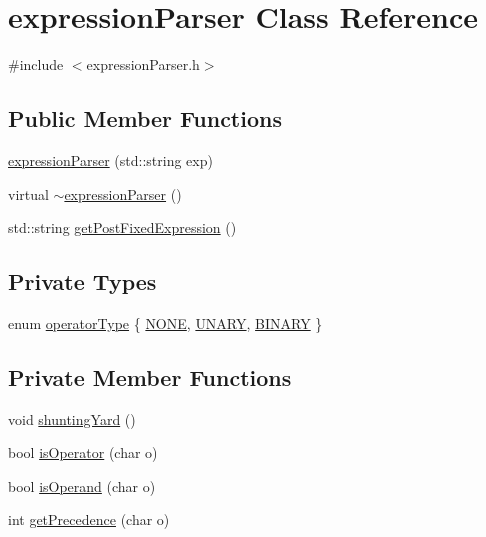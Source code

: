 \hypertarget{classexpression_parser}{\section{expression\-Parser Class Reference}
\label{classexpression_parser}
}


{\ttfamily \#include $<$expression\-Parser.\-h$>$}

\subsection*{Public Member Functions}
\begin{DoxyCompactItemize}
\item 
\hyperlink{classexpression_parser_ae675c52633c8990b0aa955fd7d9e6338}{expression\-Parser} (std\-::string exp)
\item 
virtual \hyperlink{classexpression_parser_ade3e01d93233c908ee7ae8d6bec391f7}{$\sim$expression\-Parser} ()
\item 
std\-::string \hyperlink{classexpression_parser_a718ef8608ee8b606dba30b0f249e21a9}{get\-Post\-Fixed\-Expression} ()
\end{DoxyCompactItemize}
\subsection*{Private Types}
\begin{DoxyCompactItemize}
\item 
enum \hyperlink{classexpression_parser_a32095df887afef8d80a03f4a44701b5b}{operator\-Type} \{ \hyperlink{classexpression_parser_a32095df887afef8d80a03f4a44701b5ba91e943f954b21df49669ecc73ce5d5a1}{N\-O\-N\-E}, 
\hyperlink{classexpression_parser_a32095df887afef8d80a03f4a44701b5ba5d04d7412603943afb27c772bfa42b37}{U\-N\-A\-R\-Y}, 
\hyperlink{classexpression_parser_a32095df887afef8d80a03f4a44701b5bac1c46a7480aec9c85b567d0e2de99302}{B\-I\-N\-A\-R\-Y}
 \}
\end{DoxyCompactItemize}
\subsection*{Private Member Functions}
\begin{DoxyCompactItemize}
\item 
void \hyperlink{classexpression_parser_ace72d9f52de3444cf32bae02a3be57e9}{shunting\-Yard} ()
\item 
bool \hyperlink{classexpression_parser_a6978d31ef3bcb3d4b60a0c7d77947941}{is\-Operator} (char o)
\item 
bool \hyperlink{classexpression_parser_a9dd1d833d5e5684304b49d1b0d8d7916}{is\-Operand} (char o)
\item 
int \hyperlink{classexpression_parser_af02d5c59c29bac4f1c80b3eeeb41d85d}{get\-Precedence} (char o)
\end{DoxyCompactItemize}
